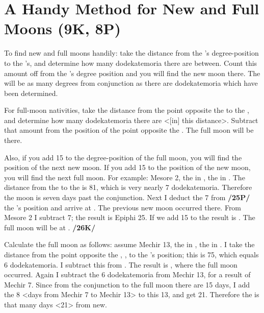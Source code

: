 \section{A Handy Method for New and Full Moons (9K, 8P)}
To find new and full moons handily: take the distance from the \Sun’s degree-position to the \Moon’s, and determine how many dodekatemoria there are between. Count this amount off from the \Sun’s degree position and you will find the new moon there. The \Moon\xspace will be as many degrees from conjunction as there are dodekatemoria which have been determined. 

For full-moon nativities, take the distance from the point opposite the \Sun\xspace to the \Moon, and determine how many dodekatemoria there are <[in] this distance>. Subtract that amount from the position of the point opposite the \Sun. The full moon will be there. 

Also, if you add 15\deg\xspace to the degree-position of the full moon, you will find the position of the next new moon. If you add 15\deg\xspace to the position of the new moon, you will find the next full moon. For example: Mesore 2, the \Sun\xspace in \Leo\xspace 5\deg, the \Moon\xspace in \Libra\xspace 26\deg. The distance from the \Sun\xspace to the \Moon\xspace is 81\deg, which is very nearly 7 dodekatemoria. Therefore the moon is seven days past the conjunction. Next I deduct the 7 from \textbf{/25P/} the \Sun’s position and arrive at \Cancer\xspace 28\deg. The previous new moon occurred there. From Mesore 2 I subtract 7; the result is Epiphi 25. If we add 15 to \Cancer\xspace 28\deg
the result is \Leo\xspace 13\deg. The full moon will be at \Aquarius\xspace 13\deg. \textbf{/26K/} 

Calculate the full moon as follows: assume Mechir 13, the \Sun\xspace in \Aquarius\xspace 22\deg, the \Moon\xspace in \Scorpio\xspace 7\deg. I take the distance from the point opposite the \Sun, \Leo\xspace 22\deg, to the \Moon’s position; this is
75\deg, which equals 6 dodekatemoria. I subtract this from \Leo\xspace 22\deg. The result is \Leo\xspace 16\deg, where the full moon occurred. Again I subtract the 6 dodekatemoria from Mechir 13, for a result of Mechir 7. Since from the conjunction to the full moon there are 15 days, I add the 8 <days from Mechir 7 to Mechir 13> to this 13, and get 21. Therefore the \Moon\xspace is that many days <21> from new.

\newpage